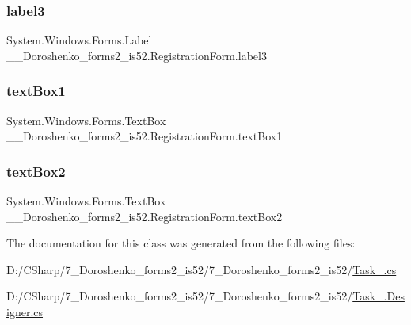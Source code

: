 \subsubsection{\texorpdfstring{label3}{label3}}
{\footnotesize\ttfamily System.\+Windows.\+Forms.\+Label \+\_\+\_\+\+Doroshenko\+\_\+forms2\+\_\+is52.\+Registration\+Form.\+label3\hspace{0.3cm}{\ttfamily [private]}}

\hypertarget{class__7___doroshenko__forms2__is52_1_1_registration_form_a060926bb200b7846ce98b37e400b702f}{}\label{class__7___doroshenko__forms2__is52_1_1_registration_form_a060926bb200b7846ce98b37e400b702f} 
\subsubsection{\texorpdfstring{text\+Box1}{textBox1}}
{\footnotesize\ttfamily System.\+Windows.\+Forms.\+Text\+Box \+\_\+\_\+\+Doroshenko\+\_\+forms2\+\_\+is52.\+Registration\+Form.\+text\+Box1\hspace{0.3cm}{\ttfamily [private]}}

\hypertarget{class__7___doroshenko__forms2__is52_1_1_registration_form_adfbd86af9d8bb7f6e3ff355e99f95f47}{}\label{class__7___doroshenko__forms2__is52_1_1_registration_form_adfbd86af9d8bb7f6e3ff355e99f95f47} 
\subsubsection{\texorpdfstring{text\+Box2}{textBox2}}
{\footnotesize\ttfamily System.\+Windows.\+Forms.\+Text\+Box \+\_\+\_\+\+Doroshenko\+\_\+forms2\+\_\+is52.\+Registration\+Form.\+text\+Box2\hspace{0.3cm}{\ttfamily [private]}}



The documentation for this class was generated from the following files\+:\begin{DoxyCompactItemize}
\item 
D\+:/\+C\+Sharp/7\+\_\+\+Doroshenko\+\_\+forms2\+\_\+is52/7\+\_\+\+Doroshenko\+\_\+forms2\+\_\+is52/\hyperlink{_task__8_8cs}{Task\+\_.\+cs}\item 
D\+:/\+C\+Sharp/7\+\_\+\+Doroshenko\+\_\+forms2\+\_\+is52/7\+\_\+\+Doroshenko\+\_\+forms2\+\_\+is52/\hyperlink{_task__8_8_designer_8cs}{Task\+\_.\+Designer.\+cs}\end{DoxyCompactItemize}

